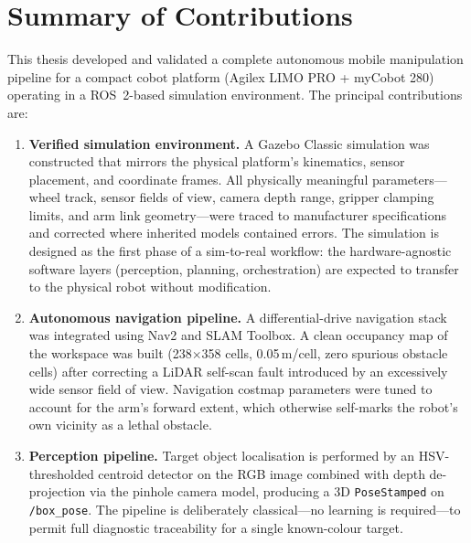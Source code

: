 
\section{Summary of Contributions}
This thesis developed and validated a complete autonomous mobile manipulation pipeline
for a compact cobot platform (Agilex LIMO PRO + myCobot 280) operating in a
ROS~2-based simulation environment. The principal contributions are:

\begin{enumerate}
    \item \textbf{Verified simulation environment.} A Gazebo Classic simulation was
    constructed that mirrors the physical platform's kinematics, sensor placement, and
    coordinate frames. All physically meaningful parameters---wheel track, sensor fields
    of view, camera depth range, gripper clamping limits, and arm link geometry---were
    traced to manufacturer specifications and corrected where inherited models contained
    errors. The simulation is designed as the first phase of a sim-to-real workflow: the
    hardware-agnostic software layers (perception, planning, orchestration) are expected
    to transfer to the physical robot without modification.

    \item \textbf{Autonomous navigation pipeline.} A differential-drive navigation stack
    was integrated using Nav2 and SLAM Toolbox. A clean occupancy map of the workspace
    was built (238$\times$358 cells, 0.05\,m/cell, zero spurious obstacle cells) after
    correcting a LiDAR self-scan fault introduced by an excessively wide sensor field of
    view. Navigation costmap parameters were tuned to account for the arm's forward
    extent, which otherwise self-marks the robot's own vicinity as a lethal obstacle.

    \item \textbf{Perception pipeline.} Target object localisation is performed by an
    HSV-thresholded centroid detector on the RGB image combined with depth de-projection
    via the pinhole camera model, producing a 3D \texttt{PoseStamped} on
    \texttt{/box\_pose}. The pipeline is deliberately classical---no learning is
    required---to permit full diagnostic traceability for a single known-colour target.


\end{enumerate}

